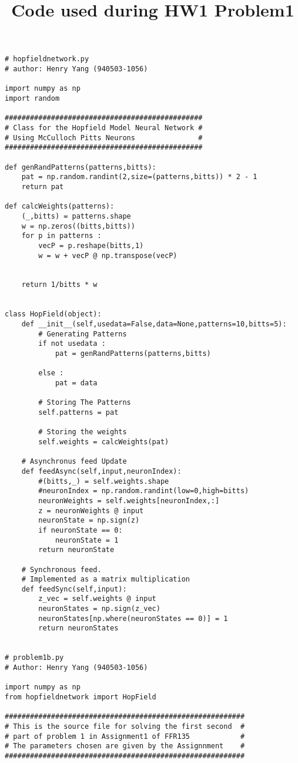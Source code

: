 \documentclass{article}
\title{Code used during HW1 Problem1}
\begin{document}
\maketitle
\begin{verbatim}
# hopfieldnetwork.py
# author: Henry Yang (940503-1056)

import numpy as np
import random

###############################################
# Class for the Hopfield Model Neural Network #
# Using McCulloch Pitts Neurons               #
###############################################

def genRandPatterns(patterns,bitts):
    pat = np.random.randint(2,size=(patterns,bitts)) * 2 - 1
    return pat

def calcWeights(patterns):
    (_,bitts) = patterns.shape 
    w = np.zeros((bitts,bitts))
    for p in patterns :
        vecP = p.reshape(bitts,1)
        w = w + vecP @ np.transpose(vecP)


    return 1/bitts * w


class HopField(object):
    def __init__(self,usedata=False,data=None,patterns=10,bitts=5):
        # Generating Patterns
        if not usedata :
            pat = genRandPatterns(patterns,bitts)

        else :
            pat = data

        # Storing The Patterns
        self.patterns = pat

        # Storing the weights
        self.weights = calcWeights(pat)

    # Asynchronus feed Update
    def feedAsync(self,input,neuronIndex):
        #(bitts,_) = self.weights.shape
        #neuronIndex = np.random.randint(low=0,high=bitts)
        neuronWeights = self.weights[neuronIndex,:]
        z = neuronWeights @ input
        neuronState = np.sign(z)
        if neuronState == 0:
            neuronState = 1
        return neuronState
    
    # Synchronous feed.
    # Implemented as a matrix multiplication
    def feedSync(self,input):
        z_vec = self.weights @ input
        neuronStates = np.sign(z_vec)
        neuronStates[np.where(neuronStates == 0)] = 1
        return neuronStates


# problem1b.py
# Author: Henry Yang (940503-1056)

import numpy as np
from hopfieldnetwork import HopField

#########################################################
# This is the source file for solving the first second  #
# part of problem 1 in Assignment1 of FFR135            #
# The parameters chosen are given by the Assignnment    #
#########################################################


\end{verbatim}
\end{document}
